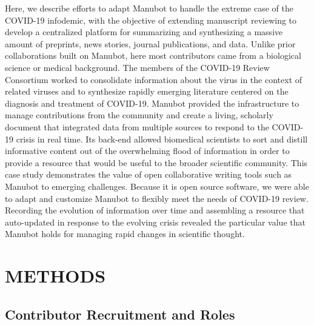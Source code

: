 \documentclass[twocolumn]{ceurart}
\begin{document}
Here, we describe efforts to adapt Manubot to handle the extreme case of the COVID-19 infodemic, with the objective of extending manuscript reviewing to develop a centralized platform for summarizing and synthesizing a massive amount of preprints, news stories, journal publications, and data.
Unlike prior collaborations built on Manubot, here most contributors came from a biological science or medical background.
The members of the COVID-19 Review Consortium worked to consolidate information about the virus in the context of related viruses and to synthesize rapidly emerging literature centered on the diagnosis and treatment of COVID-19.
Manubot provided the infrastructure to manage contributions from the community and create a living, scholarly document that integrated data from multiple sources to respond to the COVID-19 crisis in real time.
Its back-end allowed biomedical scientists to sort and distill informative content out of the overwhelming flood of information \citep{1HZeeO4Cs} in order to provide a resource that would be useful to the broader scientific community.
This case study demonstrates the value of open collaborative writing tools such as Manubot to emerging challenges.
Because it is open source software, we were able to adapt and customize Manubot to flexibly meet the needs of COVID-19 review.
Recording the evolution of information over time and assembling a resource that auto-updated in response to the evolving crisis revealed the particular value that Manubot holds for managing rapid changes in scientific thought.

\hypertarget{methods}{%
\section{METHODS}\label{methods}}

\hypertarget{contributor-recruitment-and-roles}{%
\subsection{Contributor Recruitment and Roles}\label{contributor-recruitment-and-roles}}
\end{document}
